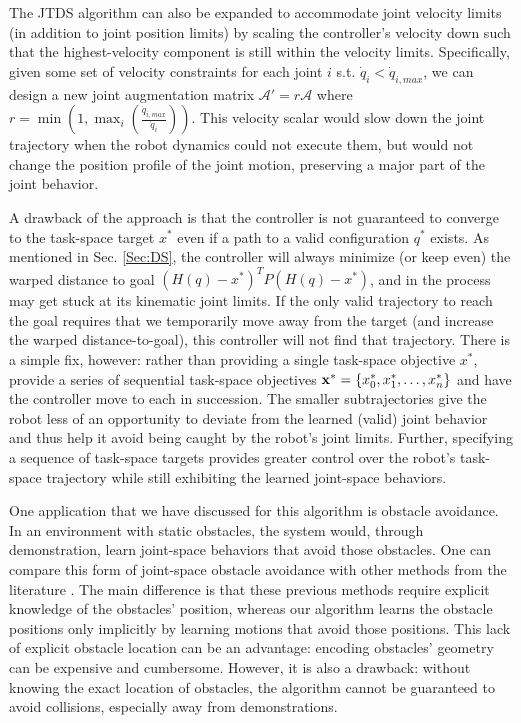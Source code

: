 \documentclass[letterpaper, 10 pt, conference,fleqn]{ieeeconf}
\begin{document}
The JTDS algorithm can also be expanded to accommodate joint velocity limits (in addition to joint position limits) by scaling the controller's velocity down such that the highest-velocity component is still within the velocity limits. Specifically, given some set of velocity constraints for each joint $i$ s.t. $\dot{q}_i < \dot{q}_{i, max}$, we can design a new joint augmentation matrix $\mathcal{A}' = r \mathcal{A}$ where $r = \min \left ( 1, \max_i \left ( \frac{\dot{q}_{i, max}}{\dot{q}_i} \right ) \right )$. This velocity scalar would slow down the joint trajectory when the robot dynamics could not execute them, but would not change the position profile of the joint motion, preserving a major part of the joint behavior.

A drawback of the approach is that the controller is not guaranteed to converge to the task-space target $x^*$ even if a path to a valid configuration $q^*$ exists. As mentioned in Sec. \ref{Sec:DS}, the controller will always minimize (or keep even) the warped distance to goal $(H(q) - x^*)^TP(H(q) - x^*)$, and in the process may get stuck at its kinematic joint limits. If the only valid trajectory to reach the goal requires that we temporarily move away from the target (and increase the warped distance-to-goal), this controller will not find that trajectory. There is a simple fix, however: rather than providing a single task-space objective $x^*$, provide a series of sequential task-space objectives $\begin{bf}x^*\end{bf} = \{ x^*_0, x^*_1, \dots, x^*_n\}$ and have the controller move to each in succession. The smaller subtrajectories give the robot less of an opportunity to deviate from the learned (valid) joint behavior and thus help it avoid being caught by the robot's joint limits. Further, specifying a sequence of task-space targets provides greater control over the robot's task-space trajectory while still exhibiting the learned joint-space behaviors.

One application that we have discussed for this algorithm is obstacle avoidance. In an environment with static obstacles, the system would, through demonstration, learn joint-space behaviors that avoid those obstacles. One can compare this form of joint-space obstacle avoidance with other methods from the literature \cite{sciavicco1988solution,petrivc2013smooth}. The main difference is that these previous methods require explicit knowledge of the obstacles' position, whereas our algorithm learns the obstacle positions only implicitly by learning motions that avoid those positions. This lack of explicit obstacle location can be an advantage: encoding obstacles' geometry can be expensive and cumbersome. However, it is also a drawback: without knowing the exact location of obstacles, the algorithm cannot be guaranteed to avoid collisions, especially away from demonstrations.
\end{document}
